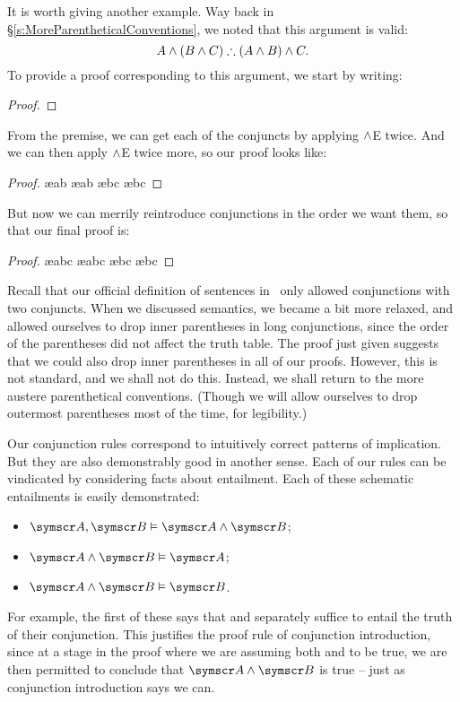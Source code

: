 It is worth giving another example. Way back in §\ref{s:MoreParentheticalConventions}, we noted that this argument is valid:
	$$A \wedge (B \wedge C) \mathrel{\therefore} (A \wedge B) \wedge C.$$
To provide a proof corresponding to this argument, we start by writing:
\begin{proof}
\end{proof}
From the premise, we can get each of the conjuncts by applying $\wedge$E twice. And we can then apply $\wedge$E twice more, so our proof looks like:
\begin{proof}
	 \ae{ab}
	 \ae{ab}
	 \ae{bc}
	 \ae{bc}
\end{proof}
But now we can merrily reintroduce conjunctions in the order we want them, so that our final proof is:
\begin{proof}
	 \ae{abc}
	 \ae{abc}
	 \ae{bc}
	 \ae{bc}
\end{proof}
Recall that our official definition of sentences in \TFL\ only allowed conjunctions with two conjuncts. When we discussed semantics, we became a bit more relaxed, and allowed ourselves to drop inner parentheses in long conjunctions, since the order of the parentheses did not affect the truth table. The proof just given suggests that we could also drop inner parentheses in all of our proofs. However, this is not standard, and we shall not do this. Instead, we shall return to the more austere parenthetical conventions. (Though we will allow ourselves to drop outermost parentheses most of the time, for legibility.)

Our conjunction rules correspond to intuitively correct patterns of implication. But they are also demonstrably good in another sense. Each of our rules can be vindicated by considering facts about entailment. Each of these schematic entailments is easily demonstrated: \begin{itemize}
	\item $\meta{A}, \meta{B} \entails \meta{A} \eand \meta{B}$;
	\item 	$\meta{A} \eand \meta{B} \entails \meta{A}$;
	\item $\meta{A} \eand \meta{B} \entails \meta{B}$.
\end{itemize} For example, the first of these says that  and  separately suffice to entail the truth of their conjunction. This justifies the proof rule of conjunction introduction, since at a stage in the proof where we are assuming both  and  to be true, we are then permitted to conclude that $\meta{A}\eand\meta{B}$ is true – just as conjunction introduction says we can.

